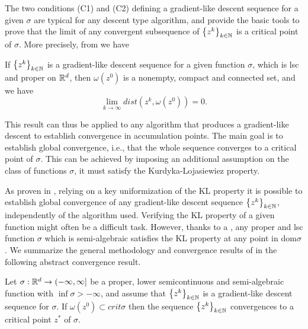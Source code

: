 The two conditions (C1) and (C2) defining a gradient-like descent sequence for a given $\sigma$ are typical for any descent type algorithm, and provide the basic tools to prove that the limit of any convergent subsequence of $\left\lbrace z^k \right\rbrace_{k \in \mathbb{N}}$ is a critical point of $\sigma$. More precisely, from \cite[Lemma 5, p. 476]{BST2014} we have

\begin{lemma}
If $\left\lbrace z^k \right\rbrace_{k \in \mathbb{N}}$ is a gradient-like descent sequence for a given function $\sigma$, which is lsc and proper on $\mathbb{R}^d$, then $\omega\left(z^0\right)$ is a nonempty, compact and connected set, and we have
\begin{equation*}
	\lim_{k\rightarrow \infty} dist\left( z^k, \omega\left(z^0\right)\right) = 0.
\end{equation*}
\end{lemma}

This result can thus be applied to any algorithm that produces a gradient-like descent to establish convergence in accumulation points. The main goal is to establish global convergence, i.e., that the whole sequence converges to a critical point of $\sigma$. This can be achieved by imposing an additional assumption on the class of functions $\sigma$, it must satisfy the Kurdyka-{L}ojasiewiez property.\medskip

As proven in \cite{BST2014}, relying on a key uniformization of the KL property it is possible to establish global convergence of any gradient-like descent sequence $\left\lbrace z^k \right\rbrace_{k \in \mathbb{N}}$, independently of the algorithm used. Verifying the KL property of a given function might often be a difficult task. However, thanks to a , any proper and lsc function $\sigma$ which is semi-algebraic satisfies the KL property at any point in dom$\sigma$. We summarize the general methodology and convergence results of \cite{BST2014} in the following abstract convergence result.

\begin{theorem}
Let $\sigma:\mathbb{R}^d \rightarrow (-\infty,\infty]$ be a proper, lower semicontinuous and semi-algebraic function with $\inf \sigma > -\infty$, and assume that $\left\lbrace z^k \right\rbrace_{k \in \mathbb{N}}$ is a gradient-like descent sequence for $\sigma$. If $\omega\left( z^0 \right) \subset crit\sigma$ then the sequence $\left\lbrace z^k \right\rbrace_{k \in \mathbb{N}}$ convergences to a critical point $z^{*}$ of $\sigma$.
\end{theorem}

